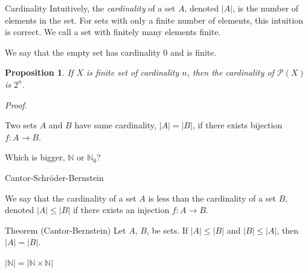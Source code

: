 \documentclass [aspectratio=169]{beamer}
\newcommand{\N}{{\mathbb{N}}}
\newcommand{\cP}{\mathcal{P}}
\newtheorem{proposition}[theorem]{Proposition}
\begin{document}
\begin{frame}{Cardinality}
Intuitively, the \emph{cardinality} of a set $A$, denoted $|A|$, is the number of elements in the set. For sets with only a finite number of elements, this intuition is correct. We call a set with finitely many elements finite. 

\vspace{1em}

We say that the empty set has cardinality 0 and is finite.



\end{frame}


\begin{frame}

\begin{proposition}
 If $X$ is finite set of cardinality $n$, then the cardinality of $\cP(X)$ is $2^n$.
\end{proposition}

\textit{Proof.}
\vspace{4cm}

\end{frame}

\begin{frame}


\end{frame}


\begin{frame}
\begin{definition}
Two sets $A$ and $B$ have same cardinality, $|A| = |B|$, if there exists bijection $f:A \to B$.
\end{definition}

\begin{example}
Which is bigger, $\N$ or $\N_0$? \\
\vspace{4cm}
\end{example}
\end{frame}


\begin{frame}{Cantor-Schr\"{o}der-Bernstein}
\begin{definition}
We say that the cardinality of a set $A$ is less than the cardinality of a set $B$, denoted $|A| \leq |B|$ if there exists an injection $f:A \to B$.
\end{definition}

\vspace{1em}

\begin{alertblock}{Theorem (Cantor-Bernstein)}
Let $A$, $B$, be sets. If $|A| \leq |B|$ and $|B| \leq |A|$, then $|A| = |B|$.
\end{alertblock}

\vspace{1em}


\begin{example}
$|\N| = |\N \times \N|$
\end{example}

\end{frame}
\end{document}
